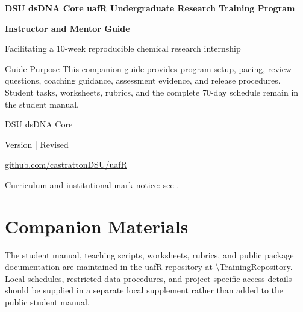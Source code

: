 \documentclass[11pt,oneside]{book}
\begin{document}

\begin{titlepage}
\pagecolor{DSULightBlue}
\begin{center}
\vspace*{0.08in}
\CoreLogoBand

\vspace{0.32in}
{\Huge\bfseries\color{DSURed} DSU dsDNA Core uafR Undergraduate Research Training Program\par}
\vspace{0.18in}
{\LARGE\bfseries Instructor and Mentor Guide\par}
\vspace{0.24in}
{\Large Facilitating a 10-week reproducible chemical research internship\par}

\vfill
\begin{programbox}[width=0.86\textwidth]{Guide Purpose}
This companion guide provides program setup, pacing, review questions,
coaching guidance, assessment evidence, and release procedures. Student tasks,
worksheets, rubrics, and the complete 70-day schedule remain in the student
manual.
\end{programbox}

\vfill
{\large DSU dsDNA Core\par}
{\large Version \TrainingVersion\space | Revised \TrainingRevisionDate\par}
{\large\href{\TrainingRepository}{github.com/castrattonDSU/uafR}\par}
\vspace{0.12in}
{\small Curriculum and institutional-mark notice: see .\par}
\end{center}
\end{titlepage}
\nopagecolor

\frontmatter
\tableofcontents


\mainmatter




\backmatter
\chapter*{Companion Materials}
The student manual, teaching scripts, worksheets, rubrics, and public package
documentation are maintained in the uafR repository at
\url{\TrainingRepository}. Local schedules, restricted-data procedures, and
project-specific access details should be supplied in a separate local
supplement rather than added to the public student manual.
\end{document}
